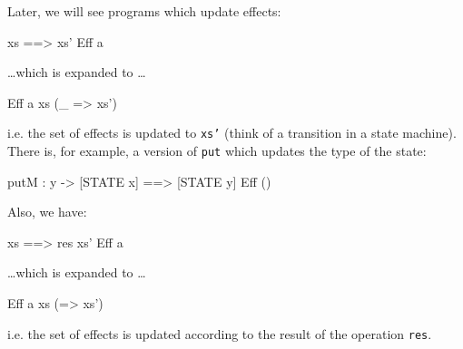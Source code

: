 \noindent
Later, we will see programs which update effects:

\begin{code}
{ xs ==> xs' } Eff a
\end{code}

\ldots which is expanded to \ldots

\begin{code}
Eff a xs (\_ => xs')
\end{code}

\noindent
i.e. the set of effects is updated to \texttt{xs'} (think of a transition
in a state machine). There is, for example, a version of \texttt{put} which
updates the type of the state:

\begin{code}
putM : y -> { [STATE x] ==> [STATE y] } Eff ()
\end{code}

\noindent
Also, we have:

\begin{code}
{ xs ==> {res} xs' } Eff a
\end{code}

\ldots which is expanded to \ldots

\begin{code}
Eff a xs (\res => xs')
\end{code}

\noindent
i.e. the set of effects is updated according to the result of the operation
\texttt{res}.
